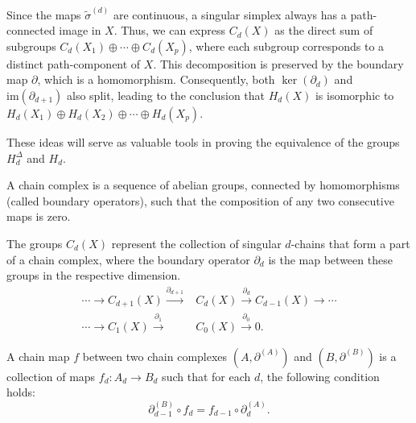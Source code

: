 Since the maps $\tilde{\sigma}^{(d)}$ are continuous, a singular simplex always
has a path-connected image in $X$. Thus, we can express $C_{d}(X)$ as the direct
sum of subgroups $C_{d}(X_{1}) \oplus \cdots \oplus C_{d}(X_{p})$, where each subgroup
corresponds to a distinct path-component of $X$. This decomposition is preserved
by the boundary map $\partial$, which is a homomorphism. Consequently, both $\ker
(\partial_{d})$ and $\mathrm{im}(\partial_{d+1})$ also split, leading to the
conclusion that $H_{d}(X)$ is isomorphic to
$H_{d}(X_{1}) \oplus H_{d}(X_{2}) \oplus \cdots \oplus H_{d}(X_{p})$.

These ideas will serve as valuable tools in proving the equivalence of the
groups $H_{d}^{\Delta}$ and $H_{d}$.

\begin{definition}
	A chain complex is a sequence of abelian groups, connected by homomorphisms (called
	boundary operators), such that the composition of
	any two consecutive maps is zero.
\end{definition}

\begin{example}
	The groups $C_{d}(X)$ represent the collection of singular $d$-chains that form
	a part of a chain complex, where the boundary operator $\partial_{d}$ is the map between these groups in the respective dimension.
	\begin{align}
		\cdots \xrightarrow{}C_{d+1}(X) \xrightarrow{\partial_{d+1}} & C_{d}(X) \xrightarrow{\partial_d}C_{d-1}(X) \xrightarrow{}\cdots \\
		\cdots \xrightarrow{}C_{1}(X) \xrightarrow{\partial_1}       & C_{0}(X) \xrightarrow{\partial_0}0.
	\end{align}
\end{example}

\begin{definition}
	A chain map $f$ between two chain complexes $(A, \partial^{(A)})$ and $(B,\partial
	^{(B)})$ is a collection of maps $f_{d}: A_{d} \rightarrow B_{d}$ such that for
	each $d$, the following condition holds:
	\begin{equation}
		\partial^{(B)}_{d-1}\circ f_{d} = f_{d-1}\circ \partial^{(A)}_{d}.
	\end{equation}
\end{definition}

